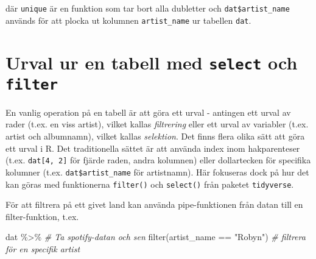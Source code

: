 \documentclass[
]{book}
\newenvironment{Shaded}{\begin{snugshade}}{\end{snugshade}}
\newcommand{\CommentTok}[1]{\textcolor[rgb]{0.56,0.35,0.01}{\textit{#1}}}
\newcommand{\FunctionTok}[1]{\textcolor[rgb]{0.00,0.00,0.00}{#1}}
\newcommand{\NormalTok}[1]{#1}
\newcommand{\SpecialCharTok}[1]{\textcolor[rgb]{0.00,0.00,0.00}{#1}}
\newcommand{\StringTok}[1]{\textcolor[rgb]{0.31,0.60,0.02}{#1}}
\theoremstyle{definition}
\theoremstyle{definition}
\theoremstyle{definition}
\theoremstyle{definition}
\theoremstyle{remark}
\begin{document}
där \texttt{unique} är en funktion som tar bort alla dubletter och \texttt{dat\$artist\_name} används för att plocka ut kolumnen \texttt{artist\_name} ur tabellen \texttt{dat}.

\hypertarget{urval-ur-en-tabell-med-select-och-filter}{%
\section{\texorpdfstring{Urval ur en tabell med \texttt{select} och \texttt{filter}}{Urval ur en tabell med select och filter}}\label{urval-ur-en-tabell-med-select-och-filter}}

En vanlig operation på en tabell är att göra ett urval - antingen ett urval av rader (t.ex. en viss artist), vilket kallas \emph{filtrering} eller ett urval av variabler (t.ex. artist och albumnamn), vilket kallas \emph{selektion}. Det finns flera olika sätt att göra ett urval i R. Det traditionella sättet är att använda index inom hakparenteser (t.ex. \texttt{dat{[}4,\ 2{]}} för fjärde raden, andra kolumnen) eller dollartecken för specifika kolumner (t.ex. \texttt{dat\$artist\_name} för artistnamn). Här fokuseras dock på hur det kan göras med funktionerna \texttt{filter()} och \texttt{select()} från paketet \texttt{tidyverse}.

För att filtrera på ett givet land kan använda pipe-funktionen från datan till en filter-funktion, t.ex.

\begin{Shaded}
\begin{Highlighting}[]
\NormalTok{dat }\SpecialCharTok{\%\textgreater{}\%}                                \CommentTok{\# Ta spotify{-}datan och sen}
  \FunctionTok{filter}\NormalTok{(artist\_name }\SpecialCharTok{==} \StringTok{"Robyn"}\NormalTok{)       }\CommentTok{\# filtrera för en specifik artist}
\end{Highlighting}
\end{Shaded}
\end{document}
